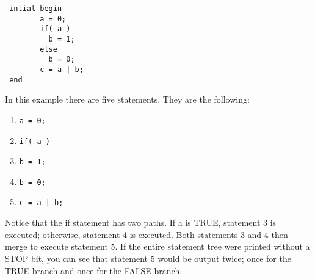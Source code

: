 \footnotesize\begin{verbatim} intial begin
        a = 0;
        if( a )
          b = 1;
        else
          b = 0;
        c = a | b;
 end
\end{verbatim}\normalsize 


 In this example there are five statements. They are the following:

\begin{enumerate}
\item 


\footnotesize\begin{verbatim}a = 0; 
\end{verbatim}\normalsize 
\item 


\footnotesize\begin{verbatim}if( a ) 
\end{verbatim}\normalsize 
\item 


\footnotesize\begin{verbatim}b = 1; 
\end{verbatim}\normalsize 
\item 


\footnotesize\begin{verbatim}b = 0; 
\end{verbatim}\normalsize 
\item 


\footnotesize\begin{verbatim}c = a | b; 
\end{verbatim}\normalsize 
\end{enumerate}


 Notice that the if statement has two paths. If a is TRUE, statement 3 is executed; otherwise, statement 4 is executed. Both statements 3 and 4 then merge to execute statement 5. If the entire statement tree were printed without a STOP bit, you can see that statement 5 would be output twice; once for the TRUE branch and once for the FALSE branch.

